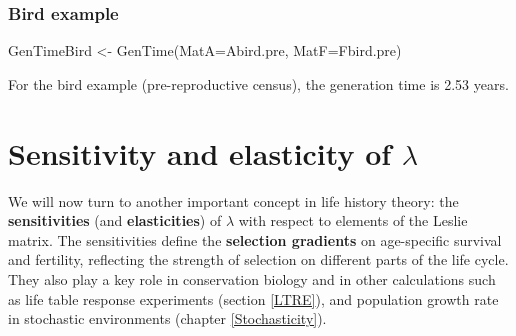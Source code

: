 \documentclass[
]{book}
\newenvironment{Shaded}{\begin{snugshade}}{\end{snugshade}}
\newcommand{\AttributeTok}[1]{\textcolor[rgb]{0.77,0.63,0.00}{#1}}
\newcommand{\ControlFlowTok}[1]{\textcolor[rgb]{0.13,0.29,0.53}{\textbf{#1}}}
\newcommand{\FunctionTok}[1]{\textcolor[rgb]{0.00,0.00,0.00}{#1}}
\newcommand{\NormalTok}[1]{#1}
\newcommand{\OtherTok}[1]{\textcolor[rgb]{0.56,0.35,0.01}{#1}}
\newcommand{\SpecialCharTok}[1]{\textcolor[rgb]{0.00,0.00,0.00}{#1}}
\begin{document}
\begin{Shaded}
\end{Shaded}

\hypertarget{bird-example-10}{%
\subsubsection*{Bird example}\label{bird-example-10}}

\begin{Shaded}
\begin{Highlighting}[]
\NormalTok{GenTimeBird }\OtherTok{\textless{}{-}} \FunctionTok{GenTime}\NormalTok{(}\AttributeTok{MatA=}\NormalTok{Abird.pre, }\AttributeTok{MatF=}\NormalTok{Fbird.pre)}
\end{Highlighting}
\end{Shaded}

For the bird example (pre-reproductive census), the generation time is 2.53 years.

\hypertarget{sensitivity-and-elasticity-of-lambda}{%
\section{\texorpdfstring{Sensitivity and elasticity of \(\lambda\)}{Sensitivity and elasticity of \textbackslash lambda}}\label{sensitivity-and-elasticity-of-lambda}}

We will now turn to another important concept in life history theory: the \textbf{sensitivities} (and \textbf{elasticities}) of \(\lambda\) with respect to elements of the Leslie matrix. The sensitivities define the \textbf{selection gradients} on age-specific survival and fertility, reflecting the strength of selection on different parts of the life cycle. They also play a key role in conservation biology and in other calculations such as life table response experiments (section \ref{LTRE}), and population growth rate in stochastic environments (chapter \ref{Stochasticity}).
\end{document}
